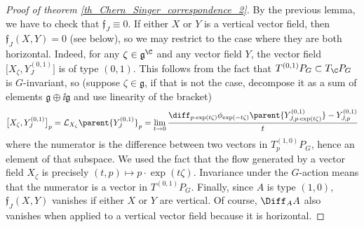 \begin{proof}[\textit{Proof of theorem} \ref{th_Chern_Singer_correspondence_2}]
    By the previous lemma, we have to check that \(\mathfrak{f}_J \equiv 0\). If either \(X\) or \(Y\) is a vertical vector field, then \(\mathfrak{f}_J(X,Y)=0\) (see below), so we may restrict to the case where they are both horizontal. Indeed, for any \(\zeta \in \mathfrak{g}^\C\) and any vector field \(Y\), the vector field \(\big[X_{\zeta}, Y_J^{(0,1)}\big]\) is of type \((0,1)\). This follows from the fact that \(T^{(0,1)}P_G\subset T_\C P_G\) is \(G\)-invariant, so (suppose \(\zeta \in \mathfrak{g}\), if that is not the case, decompose it as a sum of elements \(\mathfrak{g}\oplus \ii \mathfrak{g}\) and use linearity of the bracket)
    \[
    \big[X_{\zeta}, Y_J^{(0,1)}\big]_p=\mathcal{L}_{X_\zeta}\parent{Y_J^{(0,1)}}_p = \lim_{t\to 0}\frac{\diff_{p\cdot\exp(t\zeta)}\phi_{\exp(-t\zeta)}\parent{Y_{J,p\cdot \exp(t\zeta)}^{(0,1)}}-Y^{(0,1)}_{J, p}}{t}
    \]
    where the numerator is the difference between two vectors in \(T_p^{(1,0)}P_G\), hence an element of that subspace. We used the fact that the flow generated by a vector field \(X_\zeta\) is precisely \((t,p)\mapsto p \cdot \exp(t\zeta)\). Invariance under the \(G\)-action means that the numerator is a vector in \(T^{(0,1)}P_G\). Finally, since \(A\) is type \((1,0)\), \(\mathfrak{f}_J(X,Y)\) vanishes if either \(X\) or \(Y\) are vertical. Of course, \(\Diff_A A\) also vanishes when applied to a vertical vector field because it is horizontal. 
    

\end{proof}
